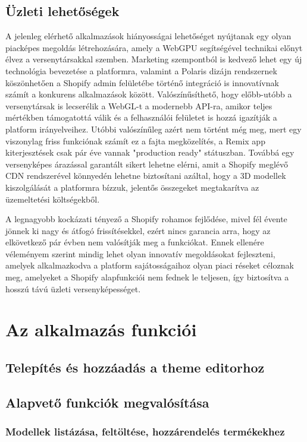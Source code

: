 \documentclass[12pt]{report}
\begin{document}
        \section{Üzleti lehetőségek}

        A jelenleg elérhető alkalmazások hiányosságai lehetőséget nyújtanak egy olyan piacképes megoldás létrehozására, amely a WebGPU segítségével technikai előnyt élvez a versenytársakkal szemben. Marketing szempontból is kedvező lehet egy új technológia bevezetése a platformra, valamint a Polaris dizájn rendszernek köszönhetően a Shopify admin felületébe történő integráció is innovatívnak számít a konkurens alkalmazások között. Valószínűsíthető, hogy előbb-utóbb a versenytársak is lecserélik a WebGL-t a modernebb API-ra, amikor teljes mértékben támogatottá válik és a felhasználói felületet is hozzá igazítják a platform irányelveihez. Utóbbi valószínűleg azért nem történt még meg, mert egy viszonylag friss funkciónak számít ez a fajta megközelítés, a Remix app kiterjesztések csak pár éve vannak "production ready" státuszban. Továbbá egy versenyképes árazással garantált sikert lehetne elérni, amit a Shopify meglévő CDN rendszerével könnyedén lehetne biztosítani azáltal, hogy a 3D modellek kiszolgálását a platformra bízzuk, jelentős összegeket megtakarítva az üzemeltetési költségekből. 
        
        A legnagyobb kockázati tényező a Shopify rohamos fejlődése, mivel fél évente jönnek ki nagy és átfogó frissítésekkel, ezért nincs garancia arra, hogy az elkövetkező pár évben nem valósítják meg a funkciókat. Ennek ellenére véleményem szerint mindig lehet olyan innovatív megoldásokat fejleszteni, amelyek alkalmazkodva a platform sajátosságaihoz olyan piaci réseket céloznak meg, amelyeket a Shopify alapfunkciói nem fednek le teljesen, így biztosítva a hosszú távú üzleti versenyképességet.

        
        \chapter{Az alkalmazás funkciói}
        \section{Telepítés és hozzáadás a theme editorhoz}
        \section{Alapvető funkciók megvalósítása}
        \subsection{Modellek listázása, feltöltése, hozzárendelés termékekhez}
\end{document}
